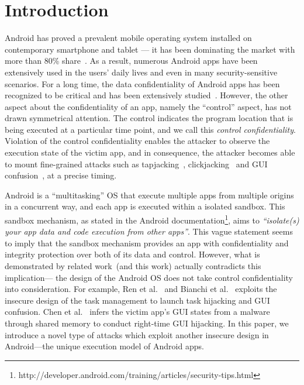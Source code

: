 \section{Introduction}
Android has proved a prevalent mobile operating system installed on contemporary smartphone and tablet --- it has been dominating the market with more than 80\% share~\cite{idc}. 
As a result, numerous Android apps have been extensively used in the users' daily lives and even in many security-sensitive scenarios. 
For a long time, the data confidentiality of Android apps has been recognized to be critical and has been extensively studied~\cite{flowdroid,....@chenkai,find 4 here}. 
However, the other aspect about the confidentiality of an app, namely the ``control'' aspect, 
has not drawn symmetrical attention. 
The control indicates the program location that is being executed at a particular time point, 
and we call this \emph{control confidentiality}. 
Violation of the control confidentiality enables the attacker to observe the execution state of the victim app, 
and in consequence, the attacker becomes able to mount fine-grained attacks such as tapjacking~\cite{@chenkai: add citation here, you can find the citation in the oakland paper}, 
clickjacking~\cite{find one or two, may be GUI state paper mentioned some} and GUI confusion~\cite{oakland paper}, at a precise timing. 

Android is a ``multitasking'' OS that execute multiple apps from multiple origins in a concurrent way, and  
each app is executed within a isolated sandbox. 
This sandbox mechanism, as stated in the Android documentation\footnote{http://developer.android.com/training/articles/security-tips.html}, aims to \emph{``isolate(s) your app data and code execution from other apps''}. 
This vague statement seems to imply that the sandbox mechanism 
provides an app with confidentiality and integrity protection over both of its data and control.  
However, what is demonstrated by related work~(and this work) actually contradicts this implication---
the design of the Android OS does not take control confidentiality into consideration. 
For example, Ren et al.~\cite{usenix15 paper} and Bianchi et al.~\cite{oakland paper} 
exploits the insecure design of the task management to launch task hijacking and GUI confusion. 
Chen et al.~\cite{GUI state paper} infers the victim app's GUI states from a malware through shared memory to conduct right-time GUI hijacking. 
In this paper, we introduce a novel type of attacks which exploit another insecure design in Android---the unique execution model of Android apps.


